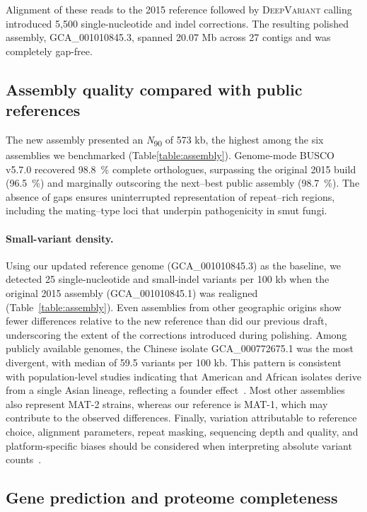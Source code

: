 \documentclass[Journal,letterpaper]{ascelike-new}
\begin{document}
Alignment of these reads to the 2015 reference followed by
\textsc{DeepVariant} calling introduced 5,500 single-nucleotide and
indel corrections. The resulting polished assembly, GCA\_001010845.3,
spanned 20.07 Mb across 27 contigs and was completely gap-free.

\subsection*{Assembly quality compared with public references}

The new assembly presented an \textit{N}\textsubscript{90} of 573 kb,
the highest among the six assemblies we benchmarked
(Table\ref{table:assembly}). Genome-mode BUSCO v5.7.0 recovered
98.8~\% complete orthologues, surpassing the
original 2015 build (96.5~\%) and marginally outscoring the
next--best public assembly (98.7~\%). The absence of gaps ensures
uninterrupted representation of repeat--rich regions, including the
mating--type loci that underpin pathogenicity in smut fungi.

\paragraph{Small-variant density.}
Using our updated reference genome (GCA\_001010845.3) as the
baseline, we detected 25 single-nucleotide and small-indel variants
per 100 kb when the original 2015
assembly (GCA\_001010845.1) was realigned (Table~\ref{table:assembly}). Even
assemblies from other geographic origins show fewer differences relative to the
new reference than did our previous draft, underscoring the extent of the
corrections introduced during polishing.  Among publicly available genomes, the
Chinese isolate GCA\_000772675.1 was the most divergent, with median
of 59.5 variants per
100 kb. This pattern is consistent with population-level studies indicating
that American and African isolates derive from a single Asian lineage,
reflecting a founder effect~\cite{RABOIN200764}. Most other assemblies also
represent MAT-2 strains, whereas our reference is MAT-1, which may contribute
to the observed differences. Finally, variation attributable to reference
choice, alignment parameters, repeat masking, sequencing depth and quality, and
platform-specific biases should be considered when interpreting absolute
variant counts~\cite{https://doi.org/10.1002/humu.24311}.

\subsection*{Gene prediction and proteome completeness}
\end{document}
